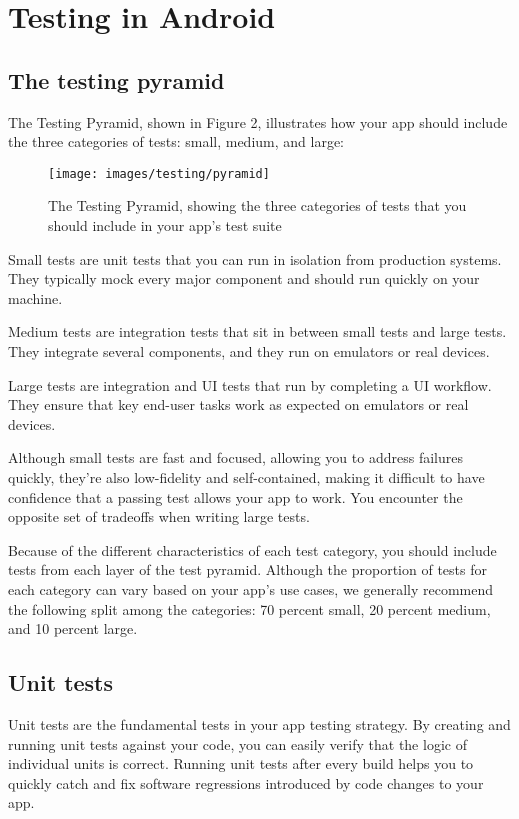 
\chapter{Testing in Android}

\section{The testing pyramid}
The Testing Pyramid, shown in Figure 2, illustrates how your app should include the three categories of tests: small, medium, and large:

\begin{figure}[h]
	\centering
	\texttt{[image: images/testing/pyramid]}
	\caption{The Testing Pyramid, showing the three categories of tests that you should include in your app's test suite}
\end{figure}


Small tests are unit tests that you can run in isolation from production systems. They typically mock every major component and should run quickly on your machine.


Medium tests are integration tests that sit in between small tests and large tests. They integrate several components, and they run on emulators or real devices.


Large tests are integration and UI tests that run by completing a UI workflow. They ensure that key end-user tasks work as expected on emulators or real devices.


Although small tests are fast and focused, allowing you to address failures quickly, they're also low-fidelity and self-contained, making it difficult to have confidence that a passing test allows your app to work. You encounter the opposite set of tradeoffs when writing large tests.

Because of the different characteristics of each test category, you should include tests from each layer of the test pyramid. Although the proportion of tests for each category can vary based on your app's use cases, we generally recommend the following split among the categories: 70 percent small, 20 percent medium, and 10 percent large.

\section{Unit tests}
Unit tests are the fundamental tests in your app testing strategy. By creating and running unit tests against your code, you can easily verify that the logic of individual units is correct. Running unit tests after every build helps you to quickly catch and fix software regressions introduced by code changes to your app.

